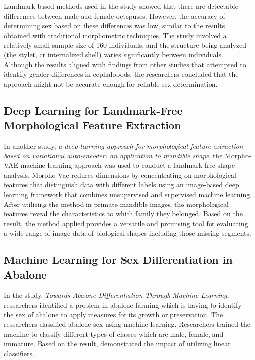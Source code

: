 Landmark-based methods used in the study showed that there are detectable differences between male and female octopuses. However, the accuracy of determining sex based on these differences was low, similar to the results obtained with traditional morphometric techniques. The study involved a relatively small sample size of 160 individuals, and the structure being analyzed (the stylet, or internalized shell) varies significantly between individuals. Although the results aligned with findings from other studies that attempted to identify gender differences in cephalopods, the researchers concluded that the approach might not be accurate enough for reliable sex determination.

\subsection{Deep Learning for Landmark-Free Morphological Feature Extraction}
In another study, \textit{a deep learning approach for morphological feature extraction based on variational auto-encoder: an application to mandible shape}, the Morpho-VAE machine learning approach was used to conduct a landmark-free shape analysis. Morpho-Vae reduces dimensions by concentrating on morphological features that distinguish data with different labels using an image-based deep learning framework that combines unsupervised and supervised machine learning. After utilizing the method in primate mandible images, the morphological features reveal the characteristics to which family they belonged. Based on the result, the method applied provides a versatile and promising tool for evaluating a wide range of image data of biological shapes including those missing segments.

\subsection{Machine Learning for Sex Differentiation in Abalone}
In the study, \textit{Towards Abalone Differentiation Through Machine Learning}, researchers identified a problem in abalone farming which is having to identify the sex of abalone to apply measures for its growth or preservation. The researchers classified abalone sex using machine learning. Researchers trained the machine to classify different types of classes which are male, female, and immature. Based on the result, demonstrated the impact of utilizing linear classifiers. 

